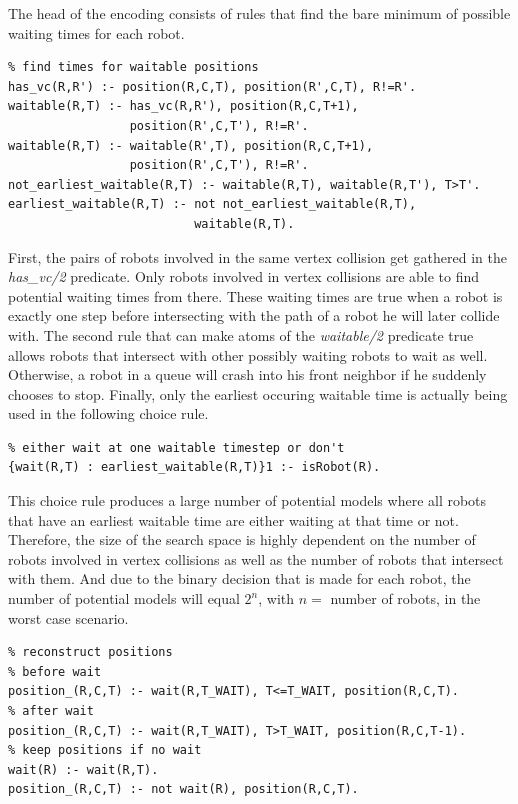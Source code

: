 \documentclass{llncs}
\begin{document}
The head of the encoding consists of rules that find the bare minimum of possible waiting times for each robot.
\begin{verbatim}
% find times for waitable positions
has_vc(R,R') :- position(R,C,T), position(R',C,T), R!=R'.
waitable(R,T) :- has_vc(R,R'), position(R,C,T+1), 
                 position(R',C,T'), R!=R'.
waitable(R,T) :- waitable(R',T), position(R,C,T+1),
                 position(R',C,T'), R!=R'.
not_earliest_waitable(R,T) :- waitable(R,T), waitable(R,T'), T>T'.
earliest_waitable(R,T) :- not not_earliest_waitable(R,T), 
                          waitable(R,T).
\end{verbatim}

First, the pairs of robots involved in the same vertex collision get gathered in the \emph{has\_vc/2} predicate. Only robots involved in vertex collisions are able to find potential waiting times from there.
These waiting times are true when a robot is exactly one step before intersecting with the path of a robot he will later collide with. The second rule that can make atoms of the \emph{waitable/2} predicate true allows robots that intersect with other possibly waiting robots to wait as well. Otherwise, a robot in a queue will crash into his front neighbor if he suddenly chooses to stop.
Finally, only the earliest occuring waitable time is actually being used in the following choice rule.

\begin{verbatim}
% either wait at one waitable timestep or don't
{wait(R,T) : earliest_waitable(R,T)}1 :- isRobot(R).
\end{verbatim}

This choice rule produces a large number of potential models where all robots that have an earliest waitable time are either waiting at that time or not. Therefore, the size of the search space is highly dependent on the number of robots involved in vertex collisions as well as the number of robots that intersect with them. And due to the binary decision that is made for each robot, the number of potential models will equal $2^n$, with $n = $ number of robots, in the worst case scenario.

\begin{verbatim}
% reconstruct positions
% before wait
position_(R,C,T) :- wait(R,T_WAIT), T<=T_WAIT, position(R,C,T).
% after wait
position_(R,C,T) :- wait(R,T_WAIT), T>T_WAIT, position(R,C,T-1).
% keep positions if no wait
wait(R) :- wait(R,T).
position_(R,C,T) :- not wait(R), position(R,C,T).
\end{verbatim}
\end{document}

